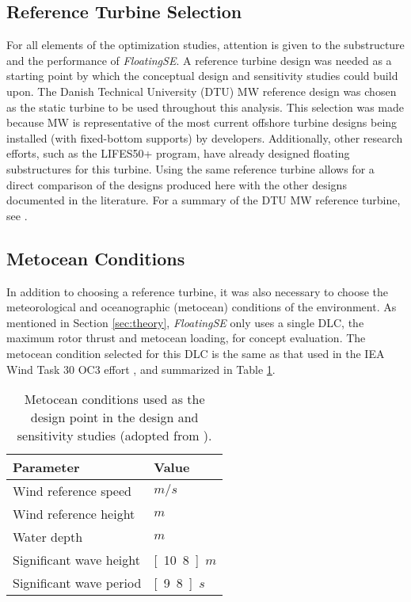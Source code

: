 \subsection{Reference Turbine Selection}
For all elements of the optimization studies, attention is given to the
substructure and the performance of \textit{FloatingSE}.  A reference
turbine design was needed as a starting point by which the conceptual
design and sensitivity studies could build upon.  The Danish Technical
University (DTU) \unit[10]{MW} reference design was chosen as the static
turbine to be used throughout this analysis.  This selection was made
because \unit[10]{MW} is representative of the most current offshore
turbine designs being installed (with fixed-bottom supports) by
developers.  Additionally, other research efforts, such as the LIFES50+
program, have already designed floating substructures for this turbine.
Using the same reference turbine allows for a direct comparison of the
designs produced here with the other designs documented in the
literature.  For a summary of the DTU \unit[10]{MW} reference turbine,
see \citet{dtu10mw}.


\subsection{Metocean Conditions}
In addition to choosing a reference turbine, it was also necessary to
choose the meteorological and oceanographic (metocean) conditions of the
environment.  As mentioned in Section \ref{sec:theory},
\textit{FloatingSE} only uses a single DLC, the maximum rotor thrust and
metocean loading, for concept evaluation.  The metocean condition
selected for this DLC is the same as that used in the IEA Wind Task 30
OC3 effort \citep{OC3}, and summarized in Table \ref{tbl:metocean}.

\begin{table}[htbp] \begin{center}
    \caption{Metocean conditions used as the design point in the design
      and sensitivity studies (adopted from \citet{OC3}).}
    \label{tbl:metocean}
          {\small
            \begin{tabular}{ l l } \hline
              \textbf{Parameter} & \textbf{Value} \\ \hline \hline
              Wind reference speed & \unit[11]{$m/s$} \\
              Wind reference height & \unit[119]{$m$} \\
              Water depth & \unit[320]{$m$} \\
              Significant wave height & \unit[10.8]{$m$} \\
              Significant wave period & \unit[9.8]{$s$} \\ \hline
            \end{tabular}
          }
\end{center} \end{table}


